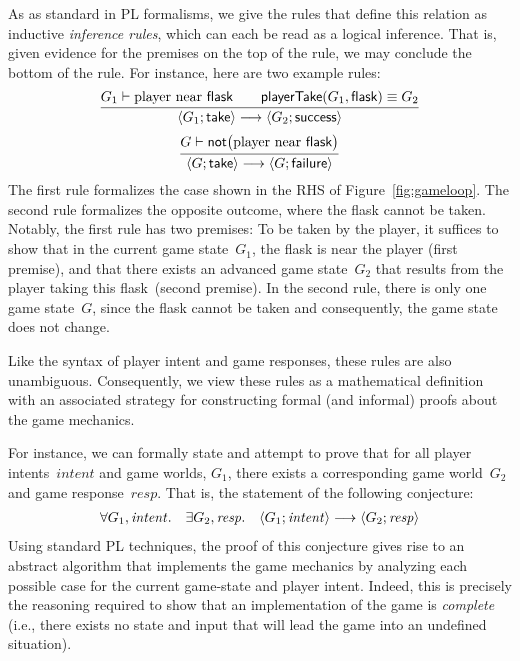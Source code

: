 As as standard in PL formalisms, we give the rules that define this
relation as inductive \emph{inference rules}, which can each be read
as a logical inference.  That is, given evidence for the premises on
the top of the rule, we may conclude the bottom of the rule.
%
For instance, here are two example rules:
\[
\infer{
  \GameStep{G_1}{\ctake}{G_2}{\textsf{success}}
}{ 
  G_1 \vdash \textrm{player near}~\textsf{flask}
  \quad
  \quad
  \textsf{playerTake}(G_1,\textsf{flask}) \equiv G_2
}
\]
\[
\infer{
  \GameStep{G}{\ctake}{G}{\textsf{failure}}
}{
  G \vdash \textsf{not}\big( \textrm{player near}~\textsf{flask} \big)
}
\]
The first rule formalizes the case shown in the RHS of
Figure~\ref{fig:gameloop}.
%
The second rule formalizes the opposite outcome, where the flask
cannot be taken.
%
Notably, the first rule has two premises: To be taken by the player,
it suffices to show that in the current game state~$G_1$, the flask is
near the player (first premise), and that there exists an advanced
game state~$G_2$ that results from the player taking this flask~(second premise).
%
In the second rule, there is only one game state~$G$, since the flask
cannot be taken and consequently, the game state does not change.

Like the syntax of player intent and game responses, these rules are
also unambiguous.
%
Consequently, we view these rules as a mathematical definition with an
associated strategy for constructing formal (and informal) proofs
about the game mechanics.

For instance, we can formally state and attempt to prove that for all
player intents~$\mathit{intent}$ and game worlds, $G_1$, there exists
a corresponding game world~$G_2$ and game response~$\mathit{resp}$.
%
That is, the statement of the following conjecture:
\[
\begin{array}{ccc}
\forall G_1, \mathit{intent}.
&
\exists G_2, \mathit{resp}.
&\left< G_1; \mathit{intent} \right> \longrightarrow \left< G_2; \mathit{resp} \right>
\end{array}
\]
Using standard PL techniques, the proof of this conjecture gives rise
to an abstract algorithm that implements the game mechanics by
analyzing each possible case for the current game-state and player
intent.
%
Indeed, this is precisely the reasoning required to show that an
implementation of the game is \emph{complete} (i.e., there exists no
state and input that will lead the game into an undefined situation).

